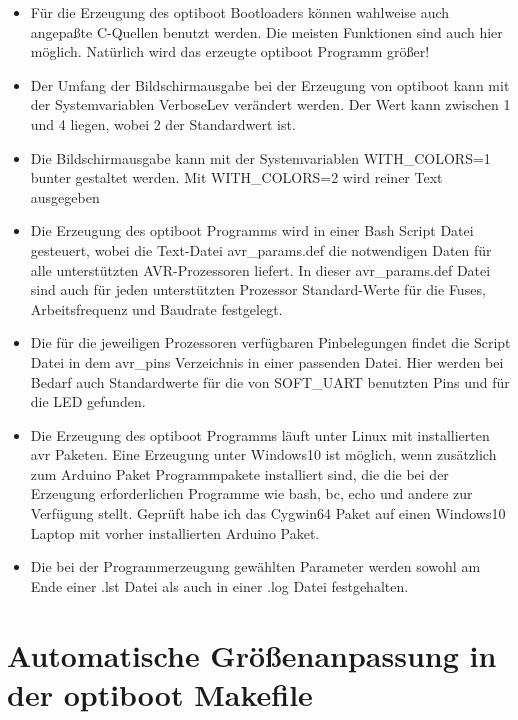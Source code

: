 \begin{itemize}

\item {Für die Erzeugung des optiboot Bootloaders können wahlweise auch angepaßte C-Quellen
	benutzt werden. Die meisten Funktionen sind auch hier möglich.
	Natürlich wird das erzeugte optiboot Programm größer!}

\item {Der Umfang der Bildschirmausgabe bei der Erzeugung von optiboot kann mit der Systemvariablen
	VerboseLev verändert werden. Der Wert kann zwischen 1 und 4 liegen, wobei 2 der Standardwert ist.}

\item {Die Bildschirmausgabe kann mit der Systemvariablen WITH\_COLORS=1 bunter gestaltet werden.
	Mit WITH\_COLORS=2 wird reiner Text ausgegeben}

\item {Die Erzeugung des optiboot Programms wird in einer Bash Script Datei gesteuert, wobei die
	Text-Datei avr\_params.def die notwendigen Daten für alle unterstützten AVR-Prozessoren liefert.
	In dieser avr\_params.def Datei sind auch für jeden unterstützten Prozessor Standard-Werte
	für die Fuses, Arbeitsfrequenz und Baudrate festgelegt.}

\item {Die für die jeweiligen Prozessoren verfügbaren Pinbelegungen findet die Script Datei 
	in dem avr\_pins Verzeichnis in einer passenden Datei. Hier werden bei Bedarf auch
	Standardwerte für die von SOFT\_UART benutzten Pins und für die LED gefunden.}

\item {Die Erzeugung des optiboot Programms läuft unter Linux mit installierten avr Paketen.
	Eine Erzeugung unter Windows10 ist möglich,
	wenn zusätzlich zum Arduino Paket Programmpakete installiert sind,
	die die bei der Erzeugung erforderlichen Programme wie bash, bc, echo und andere zur Verfügung stellt.
	Geprüft habe ich das Cygwin64 Paket auf einen Windows10 Laptop mit vorher installierten Arduino Paket.}

\item {Die bei der Programmerzeugung gewählten Parameter werden sowohl am Ende einer .lst Datei
	als auch in einer .log Datei festgehalten.}

\end{itemize}

\section{Automatische Größenanpassung in der optiboot Makefile}

